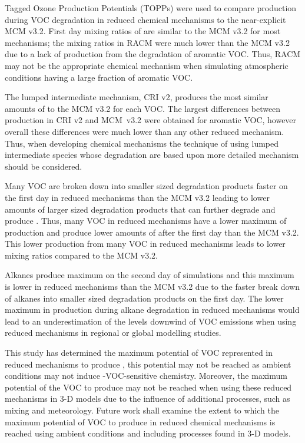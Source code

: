 Tagged Ozone Production Potentials (TOPPs) were used to compare  production during VOC degradation in reduced chemical mechanisms to the near-explicit MCM v3.2. 
First day mixing ratios of  are similar to the MCM v3.2 for most mechanisms; the  mixing ratios in RACM were much lower than the MCM v3.2 due to a lack of  production from the degradation of aromatic VOC.
Thus, RACM may not be the appropriate chemical mechanism when simulating atmospheric conditions having a large fraction of aromatic VOC.

The lumped intermediate mechanism, CRI v2, produces the most similar amounts of  to the MCM v3.2 for each VOC.
The largest differences between  production in CRI v2 and \mbox{MCM v3.2} were obtained for aromatic VOC, however overall these differences were much lower than any other reduced mechanism.
Thus, when developing chemical mechanisms the technique of using lumped intermediate species whose degradation are based upon more detailed mechanism should be considered.

Many VOC are broken down into smaller sized degradation products faster on the first day in reduced mechanisms than the MCM v3.2 leading to lower amounts of larger sized degradation products that can further degrade and produce .
Thus, many VOC in reduced mechanisms have a lower maximum of  production and produce lower amounts of  after the first day than the MCM v3.2.
This lower  production from many VOC in reduced mechanisms leads to lower  mixing ratios compared to the MCM v3.2.

Alkanes produce maximum  on the second day of simulations and this maximum is lower in reduced mechanisms than the MCM v3.2 due to the faster break down of alkanes into smaller sized degradation products on the first day.
The lower maximum in  production during alkane degradation in reduced mechanisms would lead to an underestimation of the  levels downwind of VOC emissions when using reduced mechanisms in regional or global modelling studies.

This study has determined the maximum potential of VOC represented in reduced mechanisms to produce , this potential may not be reached as ambient  conditions may not induce -VOC-sensitive chemistry.
Moreover, the maximum potential of the VOC to produce  may not be reached when using these reduced mechanisms in 3-D models due to the influence of additional processes, such as mixing and meteorology.
Future work shall examine the extent to which the maximum potential of VOC to produce  in reduced chemical mechanisms is reached using ambient  conditions and including processes found in 3-D models.
